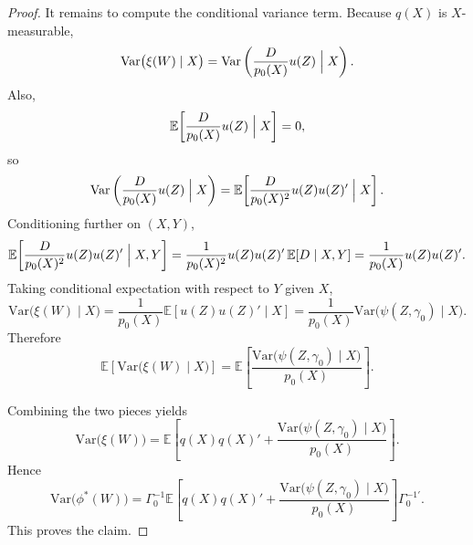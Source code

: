 \documentclass[12pt]{article}
\renewcommand{\(}{\left(}%
\renewcommand{\)}{\right)}%
\renewcommand{\[}{\left[}%
\renewcommand{\]}{\right]}%
\newtheorem{proof}{Proof.}}
\begin{document}
\begin{proof}
It remains to compute the conditional variance term. Because $q(X)$ is $X$-measurable,
\begin{equation*}
\mathrm{Var}\bigl(\xi(W)\mid X\bigr)
=
\mathrm{Var}\left(\frac{D}{p_0(X)}u(Z)\Bigm|X\right).
\end{equation*}
Also,
\begin{equation*}
\mathbb{E}\!\left[\frac{D}{p_0(X)}u(Z)\Bigm|X\right]=0,
\end{equation*}
so
\begin{equation*}
\mathrm{Var}\left(\frac{D}{p_0(X)}u(Z)\Bigm|X\right)
=
\mathbb{E}\!\left[
\frac{D}{p_0(X)^2}u(Z)u(Z)'
\Bigm|X
\right].
\end{equation*}
Conditioning further on $(X,Y)$,
\begin{equation*}
\mathbb{E}\!\left[
\frac{D}{p_0(X)^2}u(Z)u(Z)'
\Bigm|X,Y
\right]
=
\frac{1}{p_0(X)^2}u(Z)u(Z)'\,\mathbb{E}[D\mid X,Y]
=
\frac{1}{p_0(X)}u(Z)u(Z)'.
\end{equation*}
Taking conditional expectation with respect to $Y$ given $X$,
\begin{equation*}
\mathrm{Var}\bigl(\xi(W)\mid X\bigr)
=
\frac{1}{p_0(X)}\mathbb{E}[u(Z)u(Z)'\mid X]
=
\frac{1}{p_0(X)}\mathrm{Var}\bigl(\psi(Z,\gamma_0)\mid X\bigr).
\end{equation*}
Therefore
\begin{equation*}
\mathbb{E}\!\left[\mathrm{Var}\bigl(\xi(W)\mid X\bigr)\right]
=
\mathbb{E}\!\left[
\frac{\mathrm{Var}\bigl(\psi(Z,\gamma_0)\mid X\bigr)}{p_0(X)}
\right].
\end{equation*}

Combining the two pieces yields
\begin{equation*}
\mathrm{Var}\bigl(\xi(W)\bigr)
=
\mathbb{E}\!\left[
q(X)q(X)'
+
\frac{\mathrm{Var}\bigl(\psi(Z,\gamma_0)\mid X\bigr)}{p_0(X)}
\right].
\end{equation*}
Hence
\begin{equation*}
\mathrm{Var}\bigl(\phi^*(W)\bigr)
=
\Gamma_0^{-1}
\mathbb{E}\!\left[
q(X)q(X)'
+
\frac{\mathrm{Var}\bigl(\psi(Z,\gamma_0)\mid X\bigr)}{p_0(X)}
\right]
\Gamma_0^{-1'}.
\end{equation*}
This proves the claim.
\end{proof}
\end{document}
